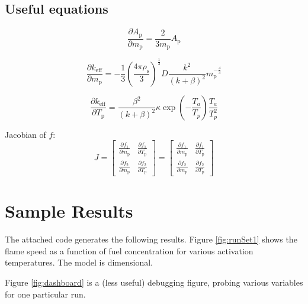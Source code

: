 \documentclass{article}
\begin{document}
\subsection{Useful equations}

\begin{equation}
    \frac{\partial A_\mathrm{p}}{\partial m_\mathrm{p}} = \frac{2}{3m_\mathrm{p}} A_\mathrm{p}
\end{equation}

\begin{equation}
    \frac{\partial k_\mathrm{eff}}{\partial m_\mathrm{p}} = -\frac{1}{3} \left( \frac{4\pi \rho_\mathrm{s}}{3} \right) ^\frac{1}{3} D \frac{k^2}{(k+\beta)^2} m_\mathrm{p}^{-\frac{4}{3}}
\end{equation}

\begin{equation}
    \frac{\partial k_\mathrm{eff}}{\partial T_\mathrm{p}} =\frac{\beta^2}{(k+\beta)^2} \kappa \exp \left( -\frac{T_a}{T_p} \right) \frac{T_a}{T_p^2}
\end{equation}

Jacobian of $f$:
\begin{equation}
J = 
\begin{bmatrix}
\frac{\partial f_1}{\partial m_\mathrm{p}} & \frac{\partial f_1}{\partial T_\mathrm{p}} \\ 
\frac{\partial f_2}{\partial m_\mathrm{p}} & \frac{\partial f_2}{\partial T_\mathrm{p}}
\end{bmatrix}
=
\begin{bmatrix}
\frac{\partial f_1}{\partial m_\mathrm{p}} & \frac{\partial f_1}{\partial T_\mathrm{p}} \\ 
\frac{\partial f_2}{\partial m_\mathrm{p}} & \frac{\partial f_2}{\partial T_\mathrm{p}}
\end{bmatrix}
\end{equation}

\section{Sample Results}

The attached code generates the following results. Figure \ref{fig:runSet1} shows the flame speed as a function of fuel concentration for various activation temperatures. The model is dimensional.

Figure \ref{fig:dashboard} is a (less useful) debugging figure, probing various variables for one particular run.
\end{document}
